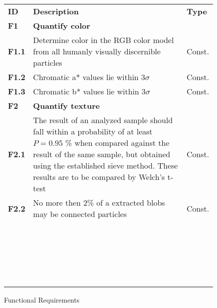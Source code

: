\begin{figure}
	\begin{tabular}{p{1cm}| p{10cm} p{1.5cm}}
		\rowcolor{ocre}
		\hline \textbf{ID} & \textbf{Description} & \textbf{Type} \\ 
		\rowcolor{bananamania}
		\hline \textbf{F1}\label{F1} & \textbf{Quantify color} &  \\ 
		\hline \textbf{F1.1}\label{F1.1} & Determine color in the RGB color model from all humanly visually discernible particles & Const. \\ 
		\hline \textbf{F1.2}\label{F1.2} & Chromatic a* values lie within $3 \sigma$ & Const. \\ 
		\hline \textbf{F1.3}\label{F1.3} & Chromatic b* values lie within $3 \sigma$ & Const. \\ 
		\rowcolor{bananamania}
		\hline \textbf{F2}\label{F2} & \textbf{Quantify texture} &  \\ 
		\hline \textbf{F2.1}\label{F2.1} & The result of an analyzed sample should fall within a probability of at least $P = 0.95$ \% when compared against the result of the same sample, but obtained using the established sieve method. These results are to be compared by Welch's t-test  &  Const. \\ 
		\hline \textbf{F2.2} & No more then 2\% of a extracted blobs may be connected particles & Const. \\ 
		\hline  &  &  \\ 
		\hline  &  &  \\ 
		\hline  &  &  \\ 
		\hline  &  &  \\ 
		\hline  &  &  \\ 
		\hline  &  &  \\ 
		\hline  &  &  \\ 
		\hline  &  &  \\ 
		\hline  &  &  \\ 
		\hline  &  &  \\ 
		\hline  &  &  \\ 
		\hline  &  &  \\ 
		\hline  &  &  \\ 
		\hline  &  &  \\ 
		\hline  &  &  \\ 
		\hline  &  &  \\ 
		\hline  &  &  \\ 
		\hline  &  &  \\ 
		\hline  &  &  \\ 
		\hline  &  &  \\ 
		\hline  &  &  \\ 
		\hline  &  &  \\ 
		\hline 
	\end{tabular} 
	\caption{Functional Requirements}\label{Functional Requirements}
\end{figure}